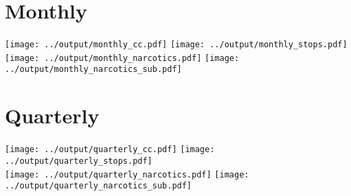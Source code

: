 \documentclass[]{article}
\title{}
\author{}
\begin{document}
\centering
\section*{Monthly}
\texttt{[image: ../output/monthly\_cc.pdf]}
\texttt{[image: ../output/monthly\_stops.pdf]}
\\
\texttt{[image: ../output/monthly\_narcotics.pdf]}
\texttt{[image: ../output/monthly\_narcotics\_sub.pdf]}
\clearpage


\section*{Quarterly}	
\texttt{[image: ../output/quarterly\_cc.pdf]}
\texttt{[image: ../output/quarterly\_stops.pdf]}
\\
\texttt{[image: ../output/quarterly\_narcotics.pdf]}
\texttt{[image: ../output/quarterly\_narcotics\_sub.pdf]}
\clearpage
\end{document}
